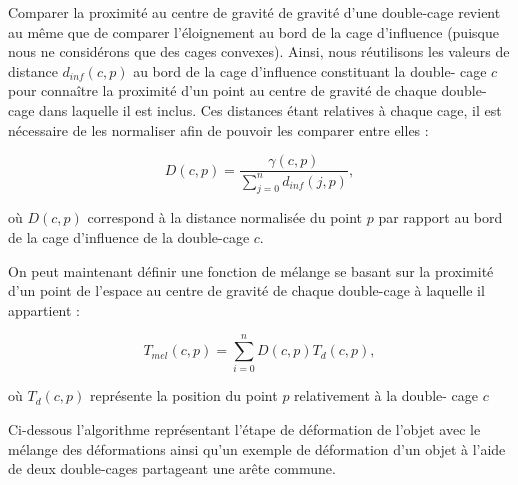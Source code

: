Comparer la proximité au centre de gravité de gravité d'une double-cage
revient au même que de comparer l'éloignement au bord de la cage d'influence
(puisque nous ne considérons que des cages convexes). Ainsi, nous réutilisons
les valeurs de distance $d_{inf}(c, p)$ au bord de la cage d'influence
constituant la double- cage $c$ pour connaître la proximité d'un point au
centre de gravité de chaque double-cage dans laquelle il est inclus. Ces
distances étant relatives à chaque cage, il est nécessaire de les normaliser
afin de pouvoir les comparer entre elles :

\begin{displaymath}
  D(c, p) = \frac{\gamma(c, p)}{\sum_{j=0}^n d_{inf}(j, p)}, 
\end{displaymath}

où $D(c, p)$ correspond à la distance normalisée du point $p$ par rapport au
bord de la cage d'influence de la double-cage $c$.

On peut maintenant définir une fonction de mélange se basant sur la proximité
d'un point de l'espace au centre de gravité de chaque double-cage à laquelle
il appartient :

\begin{displaymath}
  T_{mel}(c, p) = \sum_{i=0}^n D(c, p) T_{d}(c, p),
\end{displaymath}

où $T_{d}(c, p)$ représente la position du point $p$ relativement à la double-
cage $c$

Ci-dessous l'algorithme représentant l'étape de déformation de l'objet avec le
mélange des déformations ainsi qu'un exemple de déformation d'un objet à
l'aide de deux double-cages partageant une arête commune. \\


